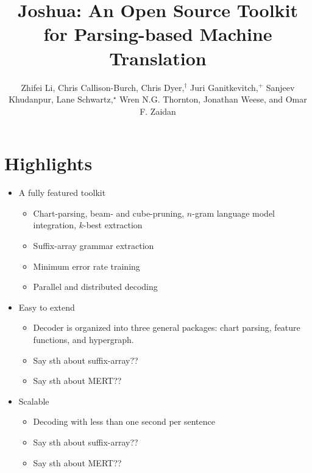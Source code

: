 \documentclass[noback]{poster}
\begin{document}
\newcommand{\don}{\ensuremath{d_{\textsc{ON}}}}
\newcommand{\doff}{\ensuremath{d_{\textsc{OFF}}}}
\newcommand{\dsoma}{\ensuremath{d_{\textsc{SOMA}}} \xspace}
\newcommand{\um}{\ensuremath{\mu \text{m}}\xspace}
\newcommand{\dmin}{d$_{\textup{min}}$\xspace}

\title{Joshua: An Open Source Toolkit for Parsing-based Machine Translation}
\author{Zhifei Li,
Chris Callison-Burch,
Chris Dyer,$^\dagger$
Juri Ganitkevitch,$^+$
Sanjeev Khudanpur, 
Lane Schwartz,$^\star$
Wren N.G. Thornton,
Jonathan Weese,
{\textnormal{and}} Omar F. Zaidan}
\address{Johns Hopkins University,
$^\dagger$University of Maryland,
$^+$RWTH Aachen University,
$^\star$University of Minnesota }

\makeposter

\section{Highlights}

\begin{itemize}

\item A fully featured toolkit
\begin{itemize}
\item Chart-parsing, beam- and cube-pruning, $n$-gram language model integration, $k$-best extraction
\item Suffix-array grammar extraction
\item Minimum error rate training
\item Parallel and distributed decoding 
\end{itemize}

\item Easy to extend
\begin{itemize}
\item Decoder is organized into three general packages: chart parsing, feature functions, and hypergraph.
\item Say sth about suffix-array??
\item Say sth about MERT??
\end{itemize}

\item Scalable
\begin{itemize}
\item Decoding with less than one second per sentence
\item Say sth about suffix-array??
\item Say sth about MERT??
\end{itemize}

\end{itemize}
\end{document}
